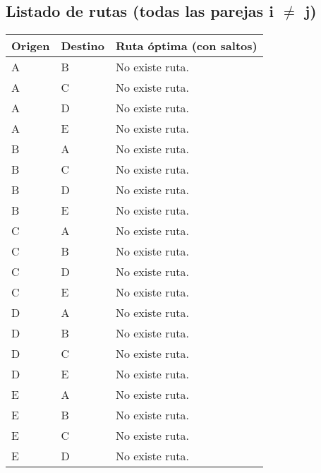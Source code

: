 \documentclass{article}
\begin{document}
\subsection*{Listado de rutas (todas las parejas i $\neq$ j)}
\begin{longtable}{llp{}}
\toprule
\textbf{Origen} & \textbf{Destino} & \textbf{Ruta óptima (con saltos)}\\\midrule
A & B & No existe ruta.\\
A & C & No existe ruta.\\
A & D & No existe ruta.\\
A & E & No existe ruta.\\
B & A & No existe ruta.\\
B & C & No existe ruta.\\
B & D & No existe ruta.\\
B & E & No existe ruta.\\
C & A & No existe ruta.\\
C & B & No existe ruta.\\
C & D & No existe ruta.\\
C & E & No existe ruta.\\
D & A & No existe ruta.\\
D & B & No existe ruta.\\
D & C & No existe ruta.\\
D & E & No existe ruta.\\
E & A & No existe ruta.\\
E & B & No existe ruta.\\
E & C & No existe ruta.\\
E & D & No existe ruta.\\
\bottomrule
\end{longtable}
\end{document}
